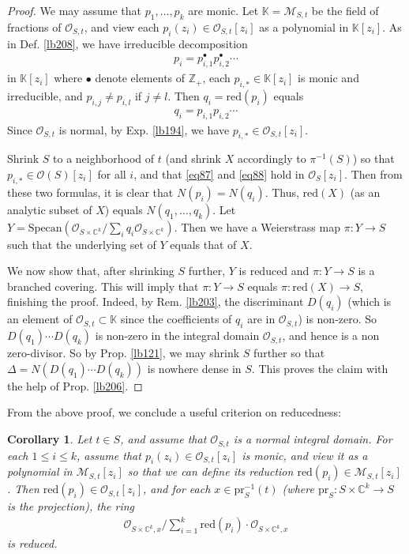 \documentclass[12pt,b5paper,notitlepage]{report}
\theoremstyle{definition}
\theoremstyle{plain}
\newtheorem{co}[df]{Corollary}
\newcommand{\scr}{\mathscr}
\newcommand{\blt}{\bullet}
\newcommand{\Kbb}{\mathbb K}
\newcommand{\Cbb}{\mathbb C}
\newcommand{\Zbb}{\mathbb Z}
\newcommand{\pr}{\mathrm {pr}}
\newcommand{\Specan}{\mathrm{Specan}}
\newcommand{\red}{\mathrm{red}}
\numberwithin{equation}{section}
\begin{document}
\begin{proof}
We may assume that $p_1,\dots,p_k$ are monic. Let $\Kbb=\scr M_{S,t}$ be the field of fractions of $\scr O_{S,t}$, and view each $p_i(z_i)\in\scr O_{S,t}[z_i]$ as a polynomial in $\Kbb[z_i]$. As in Def. \ref{lb208}, we have irreducible decomposition
\begin{align}
p_i=p_{i,1}^\blt p_{i,2}^\blt\cdots\label{eq87}
\end{align}
in $\Kbb[z_i]$ where $\blt$ denote elements of $\Zbb_+$, each $p_{i,*}\in\Kbb[z_i]$ is monic and irreducible, and $p_{i,j}\neq p_{i,l}$ if $j\neq l$. Then $q_i=\red(p_i)$ equals
\begin{align}
q_i=p_{i,1}p_{i,2}\cdots\label{eq88}
\end{align}
Since $\scr O_{S,t}$ is normal, by Exp. \ref{lb194}, we have $p_{i,*}\in\scr O_{S,t}[z_i]$. 

Shrink $S$ to a neighborhood of $t$ (and shrink $X$ accordingly to $\pi^{-1}(S)$) so that $p_{i,*}\in\scr O(S)[z_i]$ for all $i$, and that \eqref{eq87} and \eqref{eq88} hold in $\scr O_S[z_i]$. Then from these two formulas, it is clear that $N(p_i)=N(q_i)$. Thus, $\red(X)$ (as an analytic subset of $X$) equals $N(q_1,\dots,q_k)$. Let $Y=\Specan(\scr O_{S\times\Cbb^k}/\sum_i q_i\scr O_{S\times\Cbb^k})$. Then we have a Weierstrass map $\pi:Y\rightarrow S$ such that the underlying set of $Y$ equals that of $X$.

We now show that, after shrinking $S$ further, $Y$ is reduced and $\pi:Y\rightarrow S$ is a branched covering. This will imply that $\pi:Y\rightarrow S$ equals $\pi:\red(X)\rightarrow S$, finishing the proof. Indeed, by Rem. \ref{lb203}, the discriminant $D(q_i)$ (which is an element of $\scr O_{S,t}\subset\Kbb$ since the coefficients of $q_i$ are in $\scr O_{S,t}$) is non-zero. So $D(q_1)\cdots D(q_k)$ is non-zero in the integral domain $\scr O_{S,t}$, and hence is a non zero-divisor. So by Prop. \ref{lb121}, we may shrink $S$ further so that $\Delta=N(D(q_1)\cdots D(q_k))$ is nowhere dense in $S$. This proves the claim with the help of Prop. \ref{lb206}.
\end{proof}

From the above proof, we conclude a useful criterion on reducedness:

\begin{co}\label{lb379}
Let $t\in S$, and assume that $\scr O_{S,t}$ is a normal integral domain. For each $1\leq i\leq k$, assume that $p_i(z_i)\in\scr O_{S,t}[z_i]$ is monic, and view it as a polynomial in $\scr M_{S,t}[z_i]$ so that we can define its reduction $\red(p_i)\in\scr M_{S,t}[z_i]$. Then $\red(p_i)\in\scr O_{S,t}[z_i]$, and for each $x\in\pr_S^{-1}(t)$ (where $\pr_S:S\times\Cbb^k\rightarrow S$ is the projection), the ring
\begin{align*}
\scr O_{S\times\Cbb^k,x}\Big/ \sum_{i=1}^k\red(p_i)\cdot\scr O_{S\times\Cbb^k,x}
\end{align*}
is reduced.
\end{co}
\end{document}
